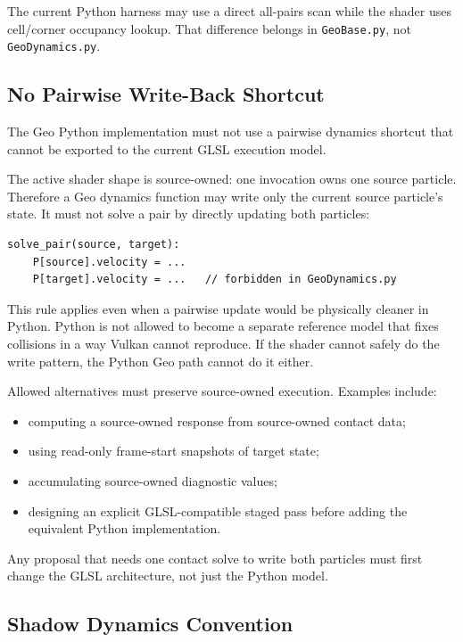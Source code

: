 The current Python harness may use a direct all-pairs scan while the shader uses
cell/corner occupancy lookup.  That difference belongs in \texttt{GeoBase.py},
not \texttt{GeoDynamics.py}.

\subsection{No Pairwise Write-Back Shortcut}

The Geo Python implementation must not use a pairwise dynamics shortcut that
cannot be exported to the current GLSL execution model.

The active shader shape is source-owned: one invocation owns one source
particle.  Therefore a Geo dynamics function may write only the current source
particle's state.  It must not solve a pair by directly updating both
particles:

\begin{verbatim}
solve_pair(source, target):
    P[source].velocity = ...
    P[target].velocity = ...   // forbidden in GeoDynamics.py
\end{verbatim}

This rule applies even when a pairwise update would be physically cleaner in
Python.  Python is not allowed to become a separate reference model that fixes
collisions in a way Vulkan cannot reproduce.  If the shader cannot safely do
the write pattern, the Python Geo path cannot do it either.

Allowed alternatives must preserve source-owned execution.  Examples include:

\begin{itemize}[leftmargin=*]
    \item computing a source-owned response from source-owned contact data;
    \item using read-only frame-start snapshots of target state;
    \item accumulating source-owned diagnostic values;
    \item designing an explicit GLSL-compatible staged pass before adding the
    equivalent Python implementation.
\end{itemize}

Any proposal that needs one contact solve to write both particles must first
change the GLSL architecture, not just the Python model.

\subsection{Shadow Dynamics Convention}

